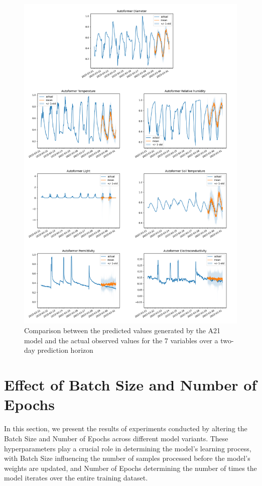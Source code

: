 \begin{figure}[htbp]
    \centering
    \includegraphics[width=15 cm]{6_ChapterResults/figuras/A21.png}
    \caption{Comparison between the predicted values generated by the A21 model and the actual observed values for the 7 variables over a two-day prediction horizon}
    \label{A21}
\end{figure}

\section{Effect of Batch Size and Number of Epochs}
In this section, we present the results of experiments conducted by altering the Batch Size and Number of Epochs across different model variants. These hyperparameters play a crucial role in determining the model's learning process, with Batch Size influencing the number of samples processed before the model’s weights are updated, and Number of Epochs determining the number of times the model iterates over the entire training dataset.

